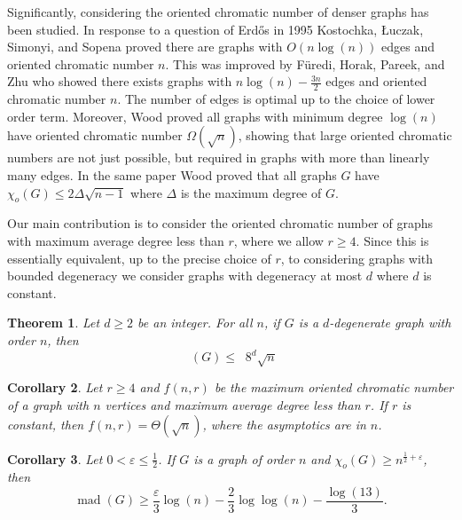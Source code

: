 \documentclass[11pt]{article}
\newtheorem{theorem}{Theorem}[section]
\newtheorem{corollary}[theorem]{Corollary}
\theoremstyle{definition}
\def\epsilon{\varepsilon}
\DeclareMathOperator{\chio}{\chi_o}
\DeclareMathOperator{\mad}{\text{mad}}
\DeclareMathOperator{\coe}{6\Big(1+\frac{9d^2}{4}\Big)^{\frac{1}{2}}d}
\begin{document}
Significantly, 
considering the oriented chromatic number of denser graphs has been studied.
In response to a question of Erd\H{o}s in 1995
Kostochka, {\L}uczak,  Simonyi, and Sopena \cite{kostochka1997minimum}
proved there are graphs with $O(n\log(n))$ edges and oriented chromatic number $n$.
This was improved by F\"{u}redi, Horak, Pareek, and Zhu \cite{furedi1998minimal}
who showed there exists graphs with $n\log(n)-\frac{3n}{2}$ edges and oriented chromatic number $n$.
The number of edges is optimal up to the choice of lower order term.
Moreover, Wood \cite{wood2007oriented} proved all graphs with minimum degree $\log(n)$
have oriented chromatic number $\Omega(\sqrt{n})$,
showing that large oriented chromatic numbers are not just possible, but required
in graphs with more than linearly many edges.
In the same paper \cite{wood2007oriented} Wood 
proved that all graphs $G$ have $\chi_o(G)\leq 2\Delta\sqrt{n-1}$
where $\Delta$ is the maximum degree of $G$.


Our main contribution 
is to consider the oriented chromatic number of graphs with maximum average degree less than $r$,
where we allow $r\geq 4$.
Since this is essentially equivalent, up to the precise choice of $r$,
to considering graphs with bounded degeneracy
we consider graphs with degeneracy at most $d$ where $d$ is constant.


\begin{theorem}\label{Thm: main}
    Let $d\geq 2$ be an integer.
    For all $n$,
    if $G$ is a $d$-degenerate graph with order $n$,
    then
    \[
    \chio(G) \leq \coe8^{d}\sqrt{n}
    \]
\end{theorem}


\begin{corollary}
    Let $r\geq 4$ and $f(n,r)$ be the maximum oriented 
    chromatic number of a graph with $n$ vertices and maximum average degree less  than $r$.
    If $r$ is constant, then $f(n,r) = \Theta(\sqrt{n})$, where the asymptotics are in $n$.
\end{corollary}


\begin{corollary}\label{Coro: Phase}
    Let $0 < \epsilon \leq \frac{1}{2}$. If $G$ is a graph of order $n$
    and $\chi_o(G)\geq n^{\frac{1}{2}+\epsilon}$,
    then 
    \[
    \mad(G) \geq \frac{\epsilon}{3}\log(n)-\frac{2}{3}\log\log(n) - \frac{\log(13)}{3}.
    \]
\end{corollary}
\end{document}
